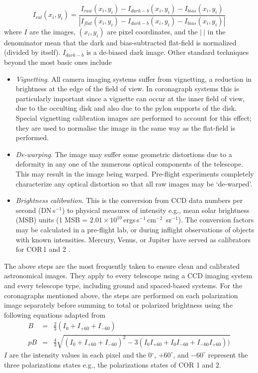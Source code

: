 \begin{equation}
I_{cal}(x_i, y_i) = \frac{ I_{raw}(x_i, y_i)  - I_{dark-b}(x_i, y_i) - I_{bias}(x_i, y_i)  }{ | I_{flat}(x_i, y_i) - I_{dark-b}(x_i, y_i) - I_{bias}(x_i, y_i)| }
\end{equation}
where $I$ are the images, $(x_i, y_i)$ are pixel coordinates, and the $|~|$ in the denominator mean that the dark and bias-subtracted flat-field is normalized (divided by itself). $I_{dark-b}$ is a de-biased dark image. Other standard techniques beyond the most basic ones include
\begin{itemize}
%
%
\item \emph{Vignetting}. All camera imaging systems suffer from vignetting, a reduction in brightness at the edge of the field of view. In coronagraph systems this is particularly important since a vignette can occur at the inner field of view, due to the occulting disk and also due to the pylon supports of the disk. Special vignetting calibration images are performed to account for this effect; they are used to normalise the image in the same way as the flat-field is performed.
%
%
\item \emph{De-warping}. The image may suffer some geometric distortions due to a deformity in any one of the numerous optical components of the telescope. This may result in the image being warped. Pre-flight experiments completely characterize any optical distortion so that all raw images may be `de-warped'.
%
%
\item \emph{Brightness calibration}. This is the conversion from CCD data numbers per second (DN\,s$^{-1}$) to physical measures of intensity e.g., mean solar brightness (MSB) units (1 MSB = $2.01\times10^{10}$\,ergs\,s$^{-1}$\,cm$^{-2}$\, sr$^{-1}$). The conversion factors may be calculated in a pre-flight lab, or during inflight observations of objects with known intensities. Mercury, Venus, or Jupiter have served as calibrators for COR\,1 and 2 \citep{thomp2008}.
\end{itemize}
The above steps are the most frequently taken to ensure clean and calibrated astronomical images. They apply to every telescope using a CCD imaging system and every telescope type, including ground and spaced-based systems. For the coronagraphs mentioned above, the steps are performed on each polarization image separately before summing to total or polarized brightness using the following equations adapted from \citet{billings1966}
\begin{eqnarray}
B &=& \frac{2}{3}(I_0 + I_{+60} + I_{-60}) \\
pB &=& \frac{4}{3}\sqrt{(I_0 + I_{+60} + I_{-60})^2 - 3(I_0I_{+60} + I_0I_{-60} + I_{-60}I_{+60}) )}
\end{eqnarray}
$I$ are the intensity values in each pixel and the 0$^{\circ}$, $+60^{\circ}$, and $-60^{\circ}$ represent the three polarizations states e.g., the polarizations states of COR 1 and 2.

